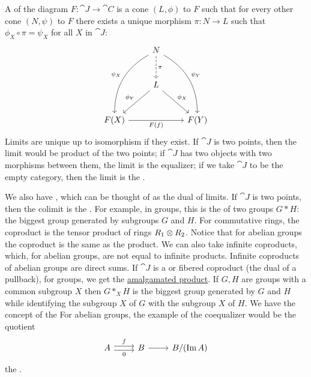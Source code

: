 \documentclass[11pt, oneside]{article}
\begin{document}
A \href{https://en.wikipedia.org/wiki/Limit_(category_theory)}{} of the diagram $F:\cat J\longrightarrow\cat C$ is a cone $(L,\phi)$ to $F$ such that for every other cone $(N,\psi)$ to $F$ there exists a unique morphism $\pi:N\longrightarrow L$ such that $\phi_X \circ \pi = \psi_X$ for all $X$ in $\cat J$:
 \[
\begin{tikzcd}[row sep = large]
& N \arrow[d, "\pi", dashed] \arrow[ddr, bend left,"\psi_Y"]   \arrow[ddl, bend right,"\psi_X",swap] & \\
& L\arrow[dr, "\phi_X"]  \arrow[dl,swap, "\phi_Y"] & \\
 F(X) \arrow[rr,swap, "F(f)"] & &  F(Y) 
\end{tikzcd}
\]
Limits are unique up to isomorphism if they exist. If $\cat J$ is two points, then the limit would be product of the two points; if $\cat J$ has two objects with two morphisms between them, the limit is the equalizer; if we take $\cat J$ to be the empty category, then the limit is the \href{https://en.wikipedia.org/wiki/Initial_and_terminal_objects}{}.

We also have \href{https://en.wikipedia.org/wiki/Limit_(category_theory)}{}, which can be thought of as the dual of limits. If $\cat J$ is two points, then the colimit is the \href{https://en.wikipedia.org/wiki/Coproduct}{}. For example, in groups, this is the \href{https://en.wikipedia.org/wiki/Free_product}{} of two groups $G*H$: the biggest group generated by subgroups $G$ and $H$. For commutative rings, the coproduct is the tensor product of rings $R_1\otimes R_2$. Notice that for abelian groups the coproduct is the same as the product. We can also take infinite coproducts, which, for abelian groups, are not equal to infinite products. Infinite coproducts of abelian groups are direct sums. If $\cat J$ is a \href{https://en.wikipedia.org/wiki/Pushout_(category_theory)}{} or fibered coproduct (the dual of a pullback), for groups, we get the \href{https://en.wikipedia.org/wiki/Free_product#Generalization:_Free_product_with_amalgamation}{\color{black}amalgamated product}. If $G,H$ are groups with a common subgroup $X$ then $G*_X H$ is the biggest group generated by $G$ and $H$ while identifying the subgroup $X$ of $G$ with the subgroup $X$ of $H$. We have the concept of the \href{https://en.wikipedia.org/wiki/Coequalizer}{} For abelian groups, the example of the coequalizer would be the quotient
\[
\begin{tikzcd}
A \arrow[r, shift left, "f"]\arrow[r, shift right, swap, "0"]& B\arrow[r] & B/(\Img A)
\end{tikzcd}
\] 
the \href{https://en.wikipedia.org/wiki/Cokernel}{}.
\end{document}
